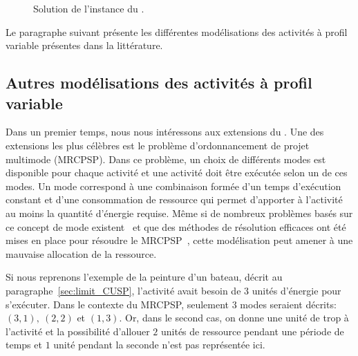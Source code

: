 \begin{ex}
\begin{figure}[!htb]
\centering
{}
\caption{Solution de l'instance du \CECSP.}
\label{sol_ex_CECSP}
\end{figure}
\end{ex}

Le paragraphe suivant présente les différentes modélisations des
activités à profil variable présentes dans la
littérature.

\subsection{Autres modélisations des activités à profil variable}

Dans un premier temps, nous nous intéressons aux extensions du
\RCPSP. Une des extensions les plus célèbres est le problème
d'ordonnancement de projet multimode (MRCPSP). Dans ce problème, un
choix de différents modes est disponible pour chaque activité et une
activité doit être exécutée selon un de ces modes. Un mode correspond
à une combinaison formée d'un temps d'exécution constant et d'une
consommation de ressource qui permet d'apporter à l'activité au moins
la quantité d'énergie requise. Même si de nombreux problèmes basés sur
ce concept de mode existent~\cite{DDH,RK,RDK,DD} et que des méthodes
de résolution efficaces ont été mises en place pour résoudre le
MRCPSP~\cite{PV}, cette modélisation peut amener à une mauvaise
allocation de la ressource.

Si nous reprenons l'exemple de la peinture d'un bateau,
décrit au paragraphe~\ref{sec:limit_CUSP}, l'activité avait besoin de
$3$ unités d'énergie pour s'exécuter. Dans le contexte du MRCPSP,
seulement $3$ modes seraient décrits: $(3,1),\ (2,2)$ et $(1,3)$. Or,
dans le second cas, on donne une unité de trop à l'activité et la
possibilité d'allouer $2$ unités de ressource pendant une période de
temps et $1$ unité pendant la seconde n'est pas représentée ici. 

